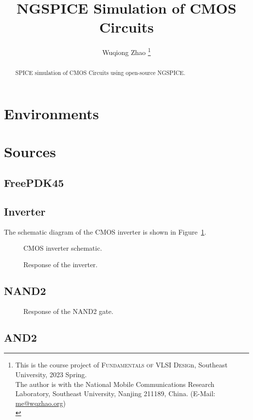 \documentclass{scrartcl}
\title{NGSPICE Simulation of CMOS Circuits}
\author{Wuqiong Zhao%
  \thanks{\>
    This is the course project of \textsc{Fundamentals of VLSI Desig}n, Southeast University, 2023 Spring.\\
    The author is with the National Mobile Communications Research Laboratory,
    Southeast University, Nanjing 211189, China. (E-Mail: \href{mailto:me@wqzhao.org}{me@wqzhao.org})\\
  }}
\newcommand{\includeres}[1]{\sffamily\scriptsize}
\begin{document}
  \maketitle

  \begin{abstract}
    SPICE simulation of CMOS Circuits using open-source NGSPICE.
  \end{abstract}

  \tableofcontents


  \section{Environments}
  \section{Sources}

    \subsection{FreePDK45}

    \subsection{Inverter}

      The schematic diagram of the CMOS inverter is shown in Figure~\ref{fig:inv}.

      \begin{figure}[htbp]
        \centering
        
        \caption{CMOS inverter schematic.}
        \label{fig:inv}
      \end{figure}

      \begin{figure}[htbp]
        \includeres{inv}
        \caption{Response of the inverter.}
      \end{figure}

    \subsection{NAND2}

      \begin{figure}[htbp]
        \includeres{nand2}
        \caption{Response of the NAND2 gate.}
      \end{figure}

    \subsection{AND2}
\end{document}

